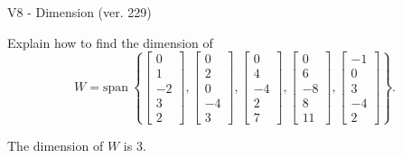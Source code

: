 \begin{exercise}
  \begin{exerciseTitle}V8 - Dimension (ver. 229)\end{exerciseTitle}
  \begin{exerciseStatement}
    Explain how to find the dimension of 
\[W=\mathrm{span}\ \left\{\left[\begin{array}{r}
0 \\
1 \\
-2 \\
3 \\
2
\end{array}\right] , \left[\begin{array}{r}
0 \\
2 \\
0 \\
-4 \\
3
\end{array}\right] , \left[\begin{array}{r}
0 \\
4 \\
-4 \\
2 \\
7
\end{array}\right] , \left[\begin{array}{r}
0 \\
6 \\
-8 \\
8 \\
11
\end{array}\right] , \left[\begin{array}{r}
-1 \\
0 \\
3 \\
-4 \\
2
\end{array}\right]\right\}.\]



  \end{exerciseStatement}
  \begin{exerciseAnswer}
   The dimension of \(W\) is  \(3\).
  


  \end{exerciseAnswer}
\end{exercise}